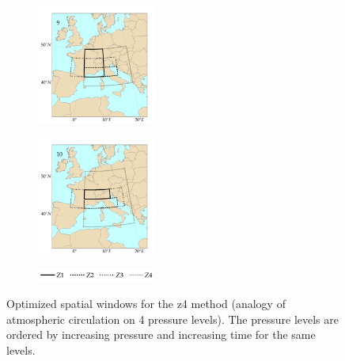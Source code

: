 \documentclass{ametsoc}
\begin{document}
\begin{figure}[htb]
\begin{subfigure}{.5\columnwidth}
		\centering
		\includegraphics[width=3.9cm]{figures/spatial_win_z4/Spatial_windows_9.png}
	\end{subfigure}%
	\begin{subfigure}{.5\columnwidth}
		\centering
		\includegraphics[width=3.9cm]{figures/spatial_win_z4/Spatial_windows_10.png}
	\end{subfigure}
	\begin{subfigure}{.5\columnwidth}
		\centering
		\includegraphics[width=3.9cm]{figures/spatial_win_z4/legend.png}
	\end{subfigure}
	\caption{Optimized spatial windows for the z4 method (analogy of atmospheric circulation on 4 pressure levels). The pressure levels are ordered by increasing pressure and increasing time for the same levels.}
	\label{fig:spatial_windows_z4}
\end{figure}
\end{document}
